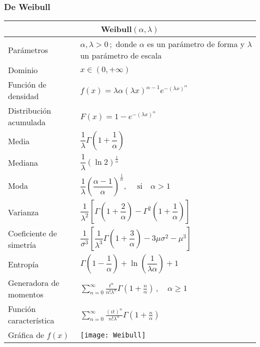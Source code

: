 \documentclass[12pt,a4paper]{article}
\begin{document}
\subsubsection*{De Weibull}
\begin{center}
	\begin{tabular}{p{}|p{}}
	\multicolumn{2}{c}{Weibull$(\alpha ,\lambda)$} \\
	\hline
	Parámetros & $\alpha ,\lambda > 0\,;$ donde $\alpha$ es un parámetro de forma y $\lambda$ un parámetro de escala \\
	Dominio & $x\in (0,+\infty )$ \\
	Función de densidad & $f(x) = \lambda\alpha (\lambda x)^{\alpha - 1}e^{-(\lambda x)^\alpha}$ \\
	Distribución acumulada & $F(x) = 1 - e^{-(\lambda x)^\alpha}$ \\
	Media & $\dfrac{1}{\lambda}\Gamma\left( 1 + \dfrac{1}{\alpha}\right)$ \\
	Mediana & $\dfrac{1}{\lambda}(\ln 2)^{\frac{1}{\alpha}}$ \\
	Moda & $\dfrac{1}{\lambda}\left( \dfrac{\alpha - 1}{\alpha} \right)^{\frac{1}{\alpha}},\quad\:\text{si}\quad\alpha > 1$ \\
	Varianza & $\dfrac{1}{\lambda^2}\left[ \Gamma\left(1 + \dfrac{2}{\alpha}\right) - \Gamma^2\left(1 + \dfrac{1}{\alpha}\right) \right]$ \\
	Coeficiente de simetría & $\dfrac{1}{\sigma^3}\left[ \dfrac{1}{\lambda^3}\Gamma\left(1 + \dfrac{3}{\alpha}\right) - 3\mu\sigma^2 - \mu^3 \right]$ \\
	Entropía & $\Gamma\left(1 - \dfrac{1}{\alpha}\right) + \ln\left(\dfrac{1}{\lambda\alpha}\right) + 1$ \\
	Generadora de momentos & $\displaystyle{\sum_{n=0}^\infty \frac{t^n}{n!\lambda^n}\Gamma\left(1 + \frac{n}{\alpha}\right)\, ,\quad\alpha\geq 1}$ \\
	Función característica & $\displaystyle{\sum_{n=0}^\infty \frac{(it)^n}{n!\lambda^n}\Gamma\left(1 + \frac{n}{\alpha}\right)}$ \\
	Gráfica de $f(x)$ & \vspace{-0.5cm}\texttt{[image: Weibull]}
	\end{tabular}
\end{center}
\end{document}

